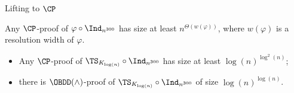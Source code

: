 \begin{frame}{Lifting to $\CP$}
    
    \begin{theorem}
        Any $\CP$-proof of $\varphi \circ \Ind_{n^{300}}$ has size at least $n^{\Theta(w(\varphi))}$,
        where $w(\varphi)$ is a resolution width of $\varphi$.
    \end{theorem}

    \begin{corollary}
        \begin{itemize}
            \item Any $\CP$-proof of $\TS_{K_{\log (n)}} \circ \Ind_{n^{300}}$ has size at least
                $\log(n)^{\log^2(n)}$;
            \item there is $\OBDD(\land)$-proof of $\TS_{K_{\log (n)}} \circ \Ind_{n^{300}}$ of size
                $\log(n)^{\log(n)}$.
        \end{itemize}
        
    \end{corollary}
    
\end{frame}
